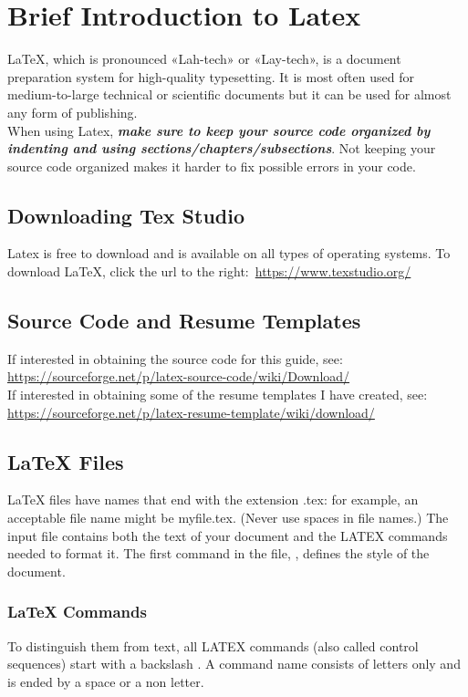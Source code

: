 \section{Brief Introduction to Latex}
\vspace{10.5cm}
	LaTeX, which is pronounced «Lah-tech» or «Lay-tech», is a document preparation system for high-quality typesetting. It is most often used for medium-to-large technical or scientific documents but it can be used for almost any form of publishing.\\
	When using Latex, \textbf{\emph{make sure to keep your source code organized by indenting and using sections/chapters/subsections}}. Not keeping your source code organized makes it harder to fix possible errors in your code.
	\subsection{Downloading Tex Studio}
			Latex is free to download and is available on all types of operating systems. To download \LaTeX, click the url to the right:\, \url{https://www.texstudio.org/}
	\subsection{Source Code and Resume Templates}
			If interested in obtaining the source code for this guide, see:\\
			\url{https://sourceforge.net/p/latex-source-code/wiki/Download/}\\
			If interested in obtaining some of the resume templates I have created, see:\\ \url{https://sourceforge.net/p/latex-resume-template/wiki/download/}
	\subsection{LaTeX Files}
			LaTeX files have names that end with the extension .tex: for example, an acceptable file name might be myfile.tex. (Never use spaces in file names.) The input file contains both the text of your document and the LATEX commands needed to format it. The first command in the file, , defines the style of the document.
	\subsubsection{LaTeX Commands}
			To distinguish them from text, all LATEX commands (also called control sequences) start with a backslash \cs. A command name consists of letters only and is ended by a space or a non letter.
